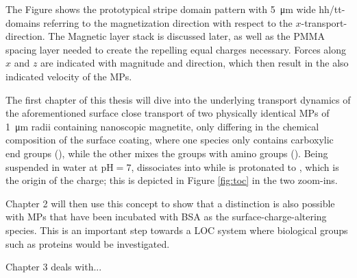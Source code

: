 The Figure shows the prototypical stripe domain pattern with \SI{5}{\micro\m} wide \ac{hh}/\ac{tt}-domains referring to the magnetization direction with respect to the $x$-transport-direction.
The Magnetic layer stack is discussed later, as well as the \ac{PMMA} spacing layer needed to create the repelling equal charges necessary. 
Forces along $x$ and $z$ are indicated with magnitude and direction, which then result in the also indicated velocity of the \acp{MP}. 

The first chapter of this thesis will dive into the underlying transport dynamics of the aforementioned surface close transport of two physically identical \acp{MP} of \SI{1}{\micro\m} radii containing nanoscopic magnetite, only differing in the chemical composition of the surface coating, where one species only contains carboxylic end groups (), while the other mixes the  groups with amino groups ().
Being suspended in water at $\mathrm{pH}=7$,  dissociates into  while  is protonated to , which is the origin of the charge; this is depicted in Figure \ref{fig:toc} in the two zoom-ins.  

Chapter 2 will then use this concept to show that a distinction is also possible with \acp{MP} that have been incubated with \ac{BSA} as the surface-charge-altering species.
This is an important step towards a \ac{LOC} system where biological groups such as proteins would be investigated.

Chapter 3 deals with...